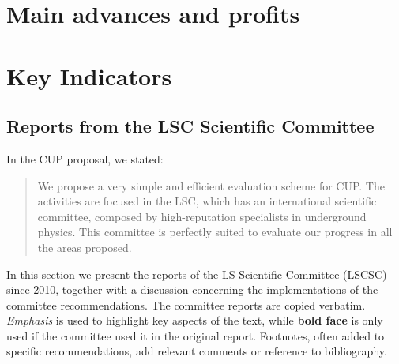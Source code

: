 \documentclass[a4paper,11pt,oneside]{article}
\begin{document}
%
%
%


\section{\bf \textsf{Main advances and profits }}


\section{\bf \textsf{ Key Indicators}}

\subsection*{Reports from the LSC Scientific Committee}

In the CUP proposal, we stated:
\begin{quotation}
We propose a very simple and efficient evaluation scheme for CUP. The  activities are focused in the LSC, which has an international scientific committee, composed by high-reputation specialists in underground physics. This committee is perfectly suited to evaluate our progress in all the areas proposed.
\end{quotation}

In this section we present the reports of the LS Scientific Committee (LSCSC) since 2010, together with a discussion concerning the implementations of the committee recommendations. The committee reports are copied verbatim. {\em Emphasis} is used to highlight key aspects of the text, while {\bf bold face} is only used if the committee used it in the original report. Footnotes, often added to specific recommendations, add relevant comments or reference to bibliography. 
\end{document}
